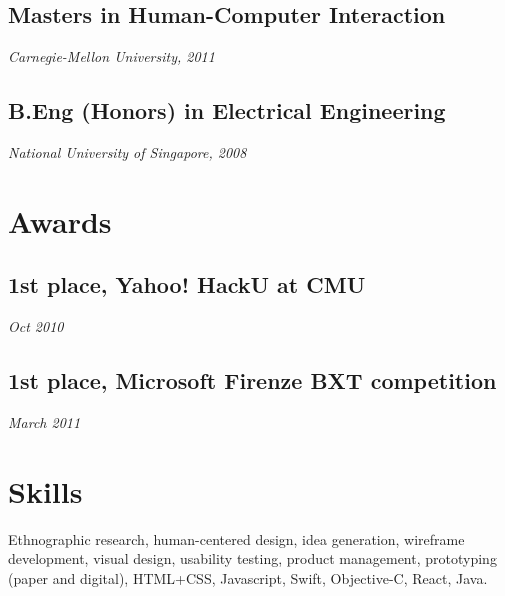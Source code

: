 \subsection[masters-in-human-computer-interaction]{Masters in
Human-Computer Interaction}

{\em Carnegie-Mellon University, 2011}

\subsection[b.eng-honors-in-electrical-engineering]{B.Eng (Honors) in
Electrical Engineering}

{\em National University of Singapore, 2008}

\section[awards]{Awards}

\subsection[st-place-yahoo-hacku-at-cmu]{1st place, Yahoo! HackU at CMU}

{\em Oct 2010}

\subsection[st-place-microsoft-firenze-bxt-competition]{1st place,
Microsoft Firenze BXT competition}

{\em March 2011}

\section[skills]{Skills}

Ethnographic research, human-centered design, idea generation, wireframe
development, visual design, usability testing, product management,
prototyping (paper and digital), HTML+CSS, Javascript, Swift,
Objective-C, React, Java.
